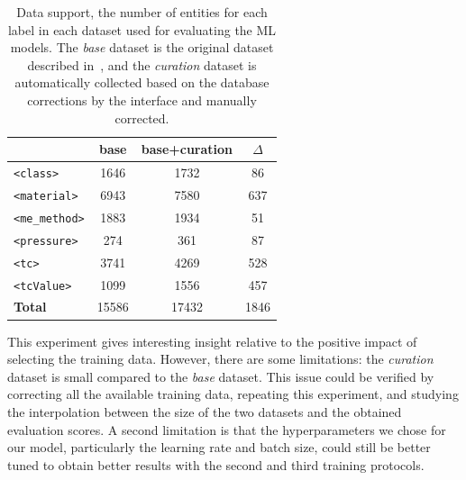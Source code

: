 \begin{table}[htbp]
\centering
\small
\caption{Data support, the number of entities for each label in each dataset used for evaluating the ML models. The \emph{base} dataset is the original dataset described in~\cite{foppiano2021supermat}, and the \emph{curation} dataset is automatically collected based on the database corrections by the interface and manually corrected.}
\begin{tabular}{lccc}
\toprule
                        & \textbf{base}     & \textbf{base+curation}    & \textbf{$\Delta$}  \\ 
\midrule
\texttt{<class>}        & 1646              & 1732                      &  86                \\
\texttt{<material>}     & 6943              & 7580                      &  637               \\
\texttt{<me\_method>}   & 1883              & 1934                      &  51                \\
\texttt{<pressure>}     & 274               & 361                       &  87                \\
\texttt{<tc>}           & 3741              & 4269                      &  528               \\
\texttt{<tcValue>}      & 1099              & 1556                      &  457               \\
\midrule
\textbf{Total}          & 15586             & 17432                     & 1846               \\ 
\bottomrule
\end{tabular}
\label{tab:training-support}
\end{table}


This experiment gives interesting insight relative to the positive impact of selecting the training data. 
However, there are some limitations: the \emph{curation} dataset is small compared to the \emph{base} dataset. This issue could be verified by correcting all the available training data, repeating this experiment, and studying the interpolation between the size of the two datasets and the obtained evaluation scores. 
A second limitation is that the hyperparameters we chose for our model, particularly the learning rate and batch size, could still be better tuned to obtain better results with the second and third training protocols.


